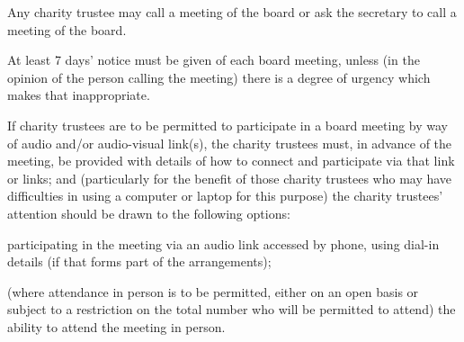 ﻿\documentclass[a4paper,11pt,onecolumn ]{article}
\begin{document}
\begin{legal}
\item Any charity trustee may call a meeting of the board or ask the secretary to call a meeting of the board.
\item At least 7 days' notice must be given of each board meeting, unless (in the opinion of the person calling the meeting) there is a degree of urgency which makes that inappropriate.
\item If charity trustees are to be permitted to participate in a board meeting by way of audio and/or audio-visual link(s), the charity trustees must, in advance of the meeting, be provided with details of how to connect and participate via that link or links; and (particularly for the benefit of those charity trustees who may have difficulties in using a computer or laptop for this purpose) the charity trustees' attention should be drawn to the following options: 
    \begin{legal}[label=\alph*)]
    \item participating in the meeting via an audio link accessed by phone, using dial-in details (if that forms part of the arrangements); 
    \item (where attendance in person is to be permitted, either on an open basis or subject to a restriction on the total number who will be permitted to attend) the ability to attend the meeting in person.
    \end{legal}
\end{legal}
\end{document}

